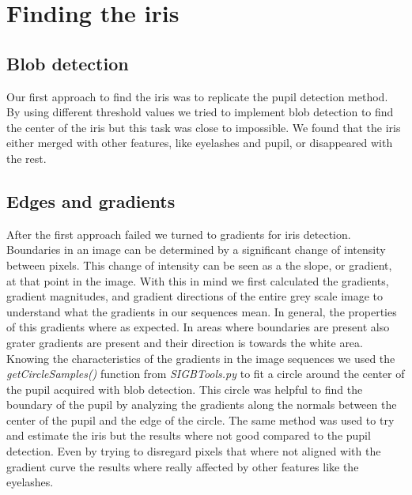 \section{Finding the iris}
\subsection{Blob detection}
Our first approach to find the iris was to replicate the pupil detection method. By using different threshold values we tried to implement blob detection to find the center of the iris but this task was close to impossible. We found that the iris either merged with other features, like eyelashes and pupil, or disappeared with the rest.
\subsection{Edges and gradients} 
After the first approach failed we turned to gradients for iris detection. Boundaries in an image can be determined by a significant change of intensity between pixels. This change of intensity can be seen as a the slope, or gradient, at that point in the image. With this in mind we first calculated the gradients, gradient magnitudes, and gradient directions of the entire grey scale image to understand what the gradients in our sequences mean. In general, the properties of this gradients where as expected. In areas where boundaries are present also grater gradients are present and their direction is towards the white area. 
Knowing the characteristics of the gradients in the image sequences we used the \emph{getCircleSamples()} function from \emph{SIGBTools.py} to fit a circle around the center of the pupil acquired with blob detection. This circle was helpful to find the boundary of the pupil by analyzing the gradients along the normals between the center of the pupil and the edge of the circle. The same method was used to try and estimate the iris but the results where not good compared to the pupil detection. Even by trying to disregard pixels that where not aligned with the gradient curve the results where really affected by other features like the eyelashes.